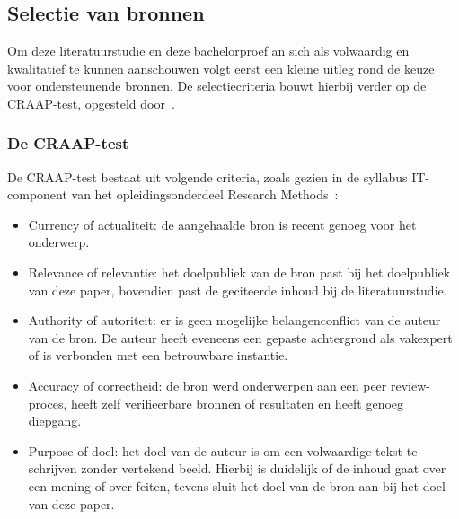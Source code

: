 \chapter{}
\label{ch:stand-van-zaken}



\section{Selectie van bronnen}
\label{sec:selectie-van-bronnen}
Om deze literatuurstudie en deze bachelorproef an sich als volwaardig en kwalitatief te kunnen aanschouwen volgt eerst een kleine uitleg rond de keuze voor ondersteunende bronnen.
De selectiecriteria bouwt hierbij verder op de CRAAP-test, opgesteld door~\textcite{Blakeslee2004}.

\subsection{De CRAAP-test}
\label{subsec:de-craap-test}
De CRAAP-test bestaat uit volgende criteria, zoals gezien in de syllabus IT-component van het opleidingsonderdeel Research Methods~\autocite{Bert2023}:
\begin{itemize}
    \item Currency of actualiteit: de aangehaalde bron is recent genoeg voor het onderwerp.
    \item Relevance of relevantie: het doelpubliek van de bron past bij het doelpubliek van deze paper, bovendien past de geciteerde inhoud bij de literatuurstudie.
    \item Authority of autoriteit: er is geen mogelijke belangenconflict van de auteur van de bron.
    De auteur heeft eveneens een gepaste achtergrond als vakexpert of is verbonden met een betrouwbare instantie.
    \item Accuracy of correctheid: de bron werd onderwerpen aan een peer review-proces, heeft zelf verifieerbare bronnen of resultaten en heeft genoeg diepgang.
    \item Purpose of doel: het doel van de auteur is om een volwaardige tekst te schrijven zonder vertekend beeld.
    Hierbij is duidelijk of de inhoud gaat over een mening of over feiten, tevens sluit het doel van de bron aan bij het doel van deze paper.
\end{itemize}

